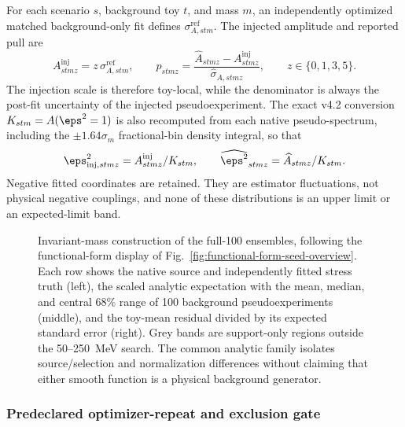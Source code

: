 For each scenario $s$, background toy $t$, and mass $m$, an independently optimized
matched background-only fit defines $\sigma^{\mathrm{ref}}_{A,stm}$.  The injected
amplitude and reported pull are
\begin{equation}
 A^{\mathrm{inj}}_{stmz}=z\,\sigma^{\mathrm{ref}}_{A,stm},
 \qquad
 p_{stmz}=\frac{\widehat A_{stmz}-A^{\mathrm{inj}}_{stmz}}
 {\widehat\sigma_{A,stmz}},
 \qquad z\in\{0,1,3,5\}.
 \label{eq:v4p6-refmatched-pull}
\end{equation}
The injection scale is therefore toy-local, while the denominator is always the
post-fit uncertainty of the injected pseudoexperiment.  The exact v4.2 conversion
$K_{stm}=A(\eps^2=1)$ is also recomputed from each native pseudo-spectrum, including
the $\pm1.64\sigma_m$ fractional-bin density integral, so that
\begin{equation}
 \eps^2_{\mathrm{inj},stmz}=A^{\mathrm{inj}}_{stmz}/K_{stm},
 \qquad
 \widehat{\eps^2}_{stmz}=\widehat A_{stmz}/K_{stm}.
 \label{eq:v4p6-eps2-coordinate}
\end{equation}
Negative fitted coordinates are retained.  They are estimator fluctuations, not
physical negative couplings, and none of these distributions is an upper limit or an
expected-limit band.

\begin{figure}[p]
\centering
{}
\caption{Invariant-mass construction of the full-100 ensembles, following the
functional-form display of Fig.~\ref{fig:functional-form-seed-overview}.  Each row
shows the native source and independently fitted stress truth (left), the scaled
analytic expectation with the mean, median, and central 68\% range of 100 background
pseudoexperiments (middle), and the toy-mean residual divided by its expected standard
error (right).  Grey bands are support-only regions outside the 50--250~MeV search.
The common analytic family isolates source/selection and normalization differences
without claiming that either smooth function is a physical background generator.}
\label{fig:v4p6-functional-form-exposure-distributions}
\end{figure}

\subsubsection{Predeclared optimizer-repeat and exclusion gate}

